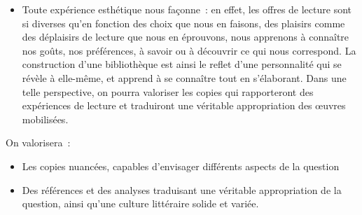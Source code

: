 {\begin{itemize}
s'affine et nos idées deviennent plus précises et plus claires pour nous~; nos valeurs
se modifient au contact des textes lus~; notre sensibilité s'enrichit et nous en prenons conscience~; notre vision du monde change grâce aux expériences de lecture et nous
adhérons à ce moi qui se transforme. Toute l'entreprise des  de 
l'illustre bien. La connaissance de soi est ainsi confrontée à l'image même de son
évolution~: l'auteur des  est aussi un lecteur évolutif, qui, par la restitution de sa
propre évolution, modifie aussi son lecteur. Au-delà de la littérature autobiographique,
la variété des œuvres et des genres traduit aussi une fluidité du Moi. La fréquentation
de la littérature permet ainsi à chacun de comprendre que la connaissance de soi n'est
pas la découverte d'une identité immuable mais plutôt le tissage d'un Moi toujours
mouvant.
\item Toute expérience esthétique nous façonne~: en effet, les offres de lecture sont si
diverses qu'en fonction des choix que nous en faisons, des plaisirs comme des
déplaisirs de lecture que nous en éprouvons, nous apprenons à connaître nos goûts,
nos préférences, à savoir ou à découvrir ce qui nous correspond. La construction d'une
bibliothèque est ainsi le reflet d'une personnalité qui se révèle à elle-même, et apprend
à se connaître tout en s'élaborant. Dans une telle perspective, on pourra valoriser les
copies qui rapporteront des expériences de lecture et traduiront une véritable
appropriation des œuvres mobilisées.
\end{itemize}

On valorisera~:
\begin{itemize}
\item Les copies nuancées, capables d'envisager différents aspects de la question
\item Des références et des analyses traduisant une véritable appropriation de la question,
ainsi qu'une culture littéraire solide et variée.
\end{itemize}}

\vfill{~}\clearpage

